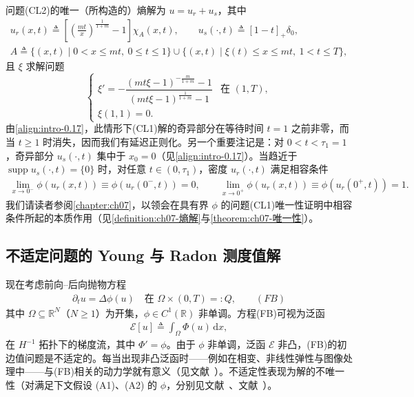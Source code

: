 \documentclass[../main.tex]{subfiles}
\begin{document}
\begin{proposition}\label{proposition:intro-0.2.4}
问题(CL2)的唯一（所构造的）熵解为 $u=u_r+u_s$，其中
\begin{align}
u_r(x,t) \triangleq  \left[\left(\frac{mt}{x}\right)^{\frac{1}{1+m}}-1\right]\chi_A(x,t),\qquad
u_s(\cdot,t) \triangleq  [1-t]_+\delta_0,
\nonumber\\
A \triangleq  \{(x,t)\mid 0<x\leqslant mt,\ 0\leqslant t\leqslant1\}
\cup\{(x,t)\mid \xi(t)\leqslant x\leqslant mt,\ 1<t\leqslant T\}, \label{align:intro-0.17}
\end{align}
且 $\xi$ 求解问题
\[
\begin{cases}
\xi' = -\dfrac{(mt\xi-1)^{-\frac{m}{1+m}}-1}{(mt\xi-1)^{\frac{1}{1+m}}-1} & \text{在 }(1,T),\\
\xi(1,1)=0.
\end{cases}
\]
由\eqref{align:intro-0.17}，此情形下(CL1)解的奇异部分在等待时间 $t=1$ 之前非零，而当 $t\geqslant1$ 时消失，因而我们有延迟正则化。另一个重要注记是：对 $0<t<\tau_1=1$，奇异部分 $u_s(\cdot,t)$ 集中于 $x_0=0$（见\eqref{align:intro-0.17}）。当趋近于 $\operatorname{supp}u_s(\cdot,t)=\{0\}$ 时，对任意 $t\in(0,\tau_1)$，密度 $u_r(\cdot,t)$ 满足相容条件
\begin{align}
\lim_{x\to0^-}\phi(u_r(x,t))\equiv\phi(u_r(0^-,t))=0,
\qquad
\lim_{x\to0^+}\phi(u_r(x,t))\equiv\phi(u_r(0^+,t))=1. \label{align:intro-0.18}
\end{align}
我们请读者参阅\cref{chapter:ch07}，以领会在具有界 $\phi$ 的问题(CL1)唯一性证明中相容条件所起的本质作用（见\cref{definition:ch07-熵解}与\cref{theorem:ch07-唯一性}）。
\end{proposition}

\subsection*{不适定问题的 Young 与 Radon 测度值解}\label{subsection:intro-illposed}

现在考虑前向--后向抛物方程
\begin{align*}
\partial_t u = \Delta\phi(u) \quad \text{在 }\Omega\times(0,T)=:Q, \qquad(FB)
\end{align*}
其中 $\Omega\subseteq\mathbb{R}^N$（$N\geqslant1$）为开集，$\phi\in C^1(\mathbb{R})$ 非单调。方程(FB)可视为泛函
\begin{align}
\mathcal{E}[u] \triangleq  \int_\Omega\Phi(u)\,\mathrm{d}x, \label{align:intro-0.19}
\end{align}
在 $H^{-1}$ 拓扑下的梯度流，其中 $\Phi'=\phi$。由于 $\phi$ 非单调，泛函 $\mathcal{E}$ 非凸，(FB)的初边值问题是不适定的。每当出现非凸泛函时——例如在相变、非线性弹性与图像处理中——与(FB)相关的动力学就有意义（见文献~\cite{ref29,ref73,ref79}）。不适定性表现为解的不唯一性（对满足下文假设 (A1)、(A2) 的 $\phi$，分别见文献~\cite{ref59}、文献~\cite{ref108}）。
\end{document}
